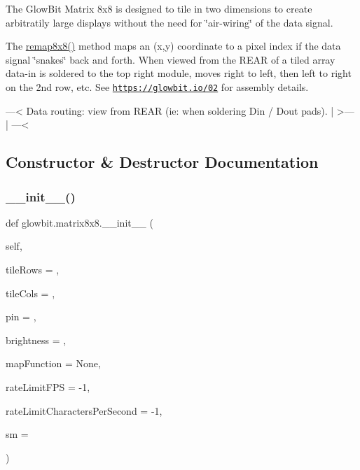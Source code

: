The Glow\+Bit Matrix 8x8 is designed to tile in two dimensions to create arbitratily large displays without the need for \char`\"{}air-\/wiring\char`\"{} of the data signal.

The \hyperlink{classglowbit_1_1matrix8x8_a67146ad236571bf9e87fe7a847c8a1d1}{remap8x8()} method maps an (x,y) coordinate to a pixel index if the data signal \char`\"{}snakes\char`\"{} back and forth. When viewed from the R\+E\+AR of a tiled array data-\/in is soldered to the top right module, moves right to left, then left to right on the 2nd row, etc. See \href{https://glowbit.io/02}{\tt https\+://glowbit.\+io/02} for assembly details. \begin{DoxyVerb}  ---<  Data routing: view from REAR (ie: when soldering Din / Dout pads).
 |
  >---
     |
  ---<\end{DoxyVerb}
 

\subsection{Constructor \& Destructor Documentation}
\mbox{\label{classglowbit_1_1matrix8x8_a7b30f3aec73c8a938a063ea640899af6}} 
\subsubsection{\texorpdfstring{\+\_\+\+\_\+init\+\_\+\+\_\+()}{\_\_init\_\_()}}
{\footnotesize\ttfamily def glowbit.\+matrix8x8.\+\_\+\+\_\+init\+\_\+\+\_\+ (\begin{DoxyParamCaption}\item[{}]{self,  }\item[{}]{tile\+Rows = {},  }\item[{}]{tile\+Cols = {},  }\item[{}]{pin = {},  }\item[{}]{brightness = {},  }\item[{}]{map\+Function = {\ttfamily None},  }\item[{}]{rate\+Limit\+F\+PS = {\ttfamily -\/1},  }\item[{}]{rate\+Limit\+Characters\+Per\+Second = {\ttfamily -\/1},  }\item[{}]{sm = {} }\end{DoxyParamCaption})}



